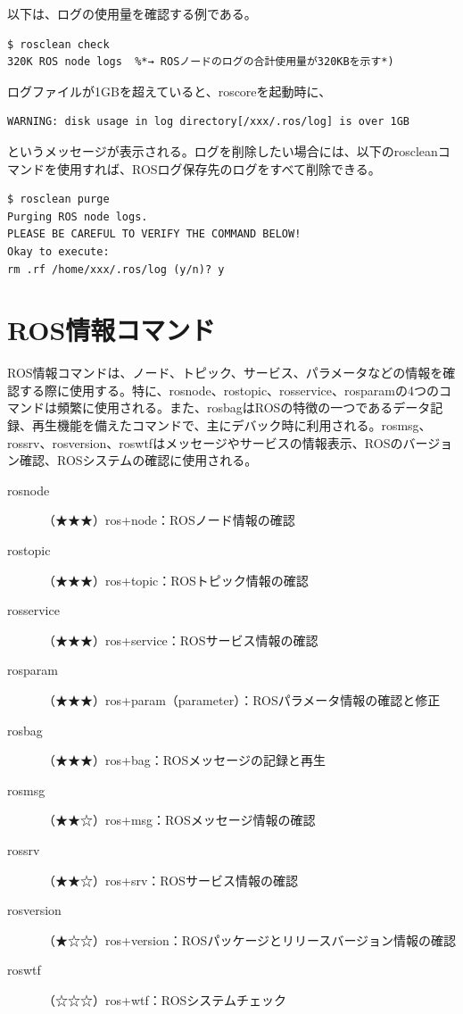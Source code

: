 以下は、ログの使用量を確認する例である。

\begin{lstlisting}[language=ROS]
$ rosclean check
320K ROS node logs  %*→ ROSノードのログの合計使用量が320KBを示す*)
\end{lstlisting}

ログファイルが1GBを超えていると、roscoreを起動時に、

\begin{lstlisting}[language=ROS]
WARNING: disk usage in log directory[/xxx/.ros/log] is over 1GB
\end{lstlisting}

というメッセージが表示される。ログを削除したい場合には、以下のroscleanコマンドを使用すれば、ROSログ保存先のログをすべて削除できる。

\begin{lstlisting}[language=ROS]
$ rosclean purge
Purging ROS node logs.
PLEASE BE CAREFUL TO VERIFY THE COMMAND BELOW!
Okay to execute:
rm .rf /home/xxx/.ros/log (y/n)? y
\end{lstlisting}

\section{ROS情報コマンド}

ROS情報コマンドは、ノード、トピック、サービス、パラメータなどの情報を確認する際に使用する。特に、rosnode、rostopic、rosservice、rosparamの4つのコマンドは頻繁に使用される。また、rosbagはROSの特徴の一つであるデータ記録、再生機能を備えたコマンドで、主にデバック時に利用される。rosmsg、rossrv、rosversion、roswtfはメッセージやサービスの情報表示、ROSのバージョン確認、ROSシステムの確認に使用される。

\vspace{\baselineskip}
\noindent
\begin{description}
\item[rosnode]（★★★）ros+node：ROSノード情報の確認
\item[rostopic]（★★★）ros+topic：ROSトピック情報の確認
\item[rosservice]（★★★）ros+service：ROSサービス情報の確認
\item[rosparam] （★★★）ros+param（parameter）：ROSパラメータ情報の確認と修正
\item[rosbag]（★★★）ros+bag：ROSメッセージの記録と再生
\item[rosmsg]（★★☆）ros+msg：ROSメッセージ情報の確認
\item[rossrv] （★★☆）ros+srv：ROSサービス情報の確認
\item[rosversion]（★☆☆）ros+version：ROSパッケージとリリースバージョン情報の確認
\item[roswtf]（☆☆☆）ros+wtf：ROSシステムチェック
\end{description}

